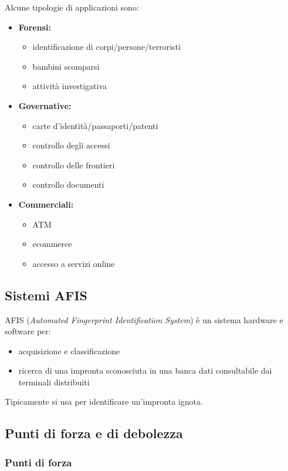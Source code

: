\noindent Alcune tipologie di applicazioni sono:
\begin{itemize}
    \item \textbf{Forensi:}
    \begin{itemize}
        \item identificazione di corpi/persone/terroristi
        \item bambini scomparsi
        \item attività investigativa
    \end{itemize}
    \item  \textbf{Governative:}
    \begin{itemize}
        \item carte d'identità/passaporti/patenti
        \item controllo degli accessi
        \item controllo delle frontieri
        \item controllo documenti
    \end{itemize}
    \item \textbf{Commerciali:}
    \begin{itemize}
        \item ATM
        \item ecommerce
        \item accesso a servizi online
    \end{itemize}
\end{itemize}

\subsection{Sistemi AFIS}

AFIS (\textit{Automated Fingerprint Identification System}) è un sistema hardware e software
per:
\begin{itemize}
    \item acquisizione e classificazione
    \item ricerca di una impronta sconosciuta in una banca dati consultabile 
    dai terminali distribuiti
\end{itemize}
Tipicamente si usa per identificare un'impronta ignota.


\subsection{Punti di forza e di debolezza}
\subsubsection{Punti di forza}

